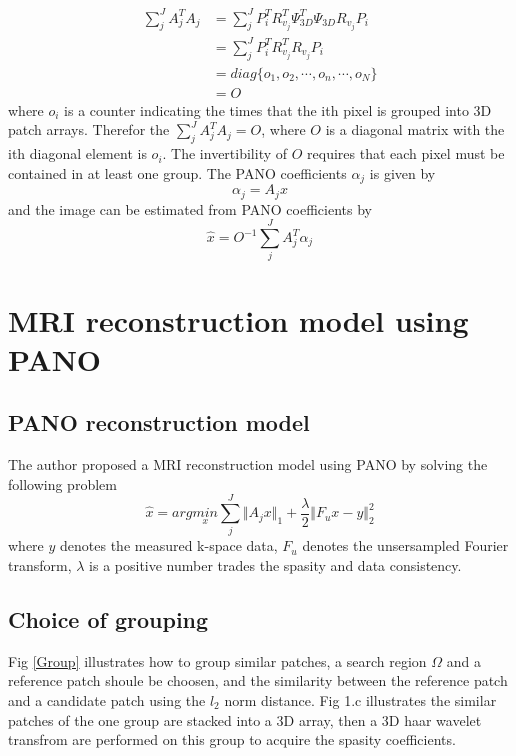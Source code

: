 \documentclass[UTF8]{article}
\begin{document}
\begin{align*}
	\sum_{j}^{J}A_j^TA_j &= \sum_{j}^{J} P_i^TR_{v_j}^T\Psi_{3D}^T\Psi_{3D}R_{v_j}P_i \\
						 &= \sum_{j}^{J} P_i^TR_{v_j}^TR_{v_j}P_i \\
						 & = diag\{o_1, o_2, \cdots, o_n, \cdots, o_N\} \\
						 & = O
\end{align*}
where $o_i$ is a counter indicating the times that the ith pixel is grouped into 3D patch arrays. Therefor the $\sum_{j}^{J}A_j^TA_j = O$, where $O$ is a diagonal matrix with the ith diagonal element is $o_i$. The invertibility of $O$ requires that each pixel must be contained in at least one group. The PANO coefficients $\alpha_j$ is given by
\begin{equation}
	\alpha_j = A_j x
\end{equation}
and the image  can be estimated from PANO coefficients by
\begin{equation}
	\hat{x} = O^{-1} \sum_j^J A_j^T \alpha_j
\end{equation}

\section{MRI reconstruction model using PANO}
\subsection{PANO reconstruction model}
The author proposed a MRI reconstruction model using PANO by solving the following problem
\begin{equation} \label{PANOModel}
	\hat{x}=arg \underset{x}{min} \sum_{j}^{J} \Vert A_j x\Vert_1 + \frac{\lambda}{2} \Vert F_u x-y \Vert_2^2 
\end{equation}
where $y$ denotes the measured k-space data, $F_u$ denotes the unsersampled Fourier transform, $\lambda$ is a positive number trades the spasity and data consistency.

\subsection{Choice of grouping}
\par Fig \ref{Group} illustrates how to group similar patches, a search region $\Omega$ and a reference patch shoule be choosen, and the similarity between the reference patch and a candidate patch using the $l_2$ norm distance. Fig 1.c illustrates the similar patches of the one group are stacked into a 3D array, then a 3D haar wavelet transfrom are performed on this group to acquire the spasity coefficients.
\end{document}
